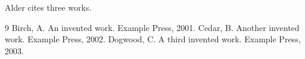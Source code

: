 \documentclass{article}
\begin{document}
Alder cites three works.
\begin{thebibliography}{9}
 Birch, A. An invented work. Example Press, 2001.
 Cedar, B. Another invented work. Example Press, 2002.
 Dogwood, C. A third invented work. Example Press, 2003.
\end{thebibliography}
\end{document}

